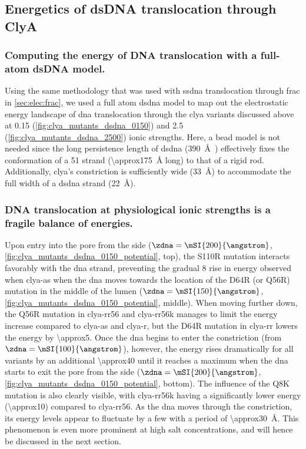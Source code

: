 %
\subsection{Energetics of {dsDNA} translocation through {ClyA}}
%
\label{sec:elec:clya:dna}

\subsubsection{Computing the energy of DNA translocation with a full-atom {dsDNA} model.}
%

Using the same methodology that was used with \gls{ssdna} translocation through \gls{frac} in
\cref{sec:elec:frac}, we used a full atom \gls{dsdna} model to map out the electrostatic energy landscape of
\gls{dna} translocation through the \gls{clya} variants discussed above at \SI{0.15}{\Molar}
(\cref{fig:clya_mutants_dsdna_0150}) and \SI{2.5}{\Molar} (\cref{fig:clya_mutants_dsdna_2500}) ionic
strengths. Here, a bead model is not needed since the long persistence length of \gls{dsdna}
(\SI{390}{\angstrom}~\cite{Gross-2011}) effectively fixes the conformation of a \SI{51}{\bp} strand
(\SI{\approx175}{\angstrom} long) to that of a rigid rod. Additionally, \gls{clya}'s \transi{} constriction is
sufficiently wide (\SI{33}{\angstrom}) to accommodate the full width of a \gls{dsdna} strand
(\SI{22}{\angstrom}).

\subsubsection{DNA translocation at physiological ionic strengths is a fragile balance of energies.}
%

Upon entry into the pore from the \cisi{} side ($\zdna = \mSI{200}{\angstrom}$,
\cref{fig:clya_mutants_dsdna_0150_potential}, top), the S110R mutation interacts favorably with the \gls{dna}
strand, preventing the gradual \SI{+8}{\kT} rise in energy observed when \gls{clya-as} when the \gls{dna}
moves towards the location of the  D64R (or Q56R) mutation in the middle of the lumen ($\zdna =
\mSI{150}{\angstrom}$, \cref{fig:clya_mutants_dsdna_0150_potential}, middle). When moving further down, the
Q56R mutation in \gls{clya-rr56} and \gls{clya-rr56k} manages to limit the energy increase compared to
\gls{clya-as} and \gls{clya-r}, but the D64R mutation in \gls{clya-rr} lowers the energy by
\SI{\approx5}{\kT}. Once the \gls{dna} begins to enter the constriction (from $\zdna = \mSI{100}{\angstrom}$),
however, the energy rises dramatically for all variants by an additional \SI{\approx40}{\kT} until it reaches
a maximum when the \gls{dna} starts to exit the pore from the \transi{} side ($\zdna = \mSI{200}{\angstrom}$,
\cref{fig:clya_mutants_dsdna_0150_potential}, bottom). The influence of the Q8K mutation is also clearly
visible, with \gls{clya-rr56k} having a significantly lower energy (\SI{\approx10}{\kT}) compared to
\gls{clya-rr56}. As the \gls{dna} moves through the constriction, its energy levels appear to fluctuate by a
few \si{\kT} with a period of \SI{\approx30}{\angstrom}. This phenomenon is even more prominent at high salt
concentrations, and will hence be discussed in the next section. 


